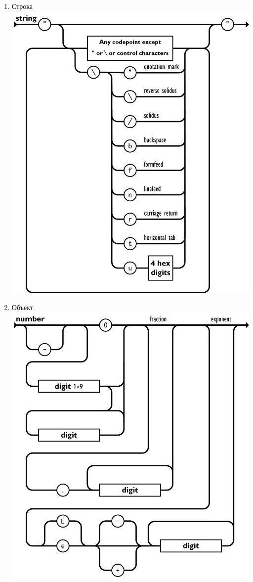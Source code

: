 \documentclass[a4page]{article}
\begin{document}
\begin{enumerate}
	\item Строка \\
	      \includegraphics[scale=0.6]{string.png}
	      \newpage
	\item Объект \\
	      \includegraphics[scale=0.6]{number.png}

\end{enumerate}
\end{document}
